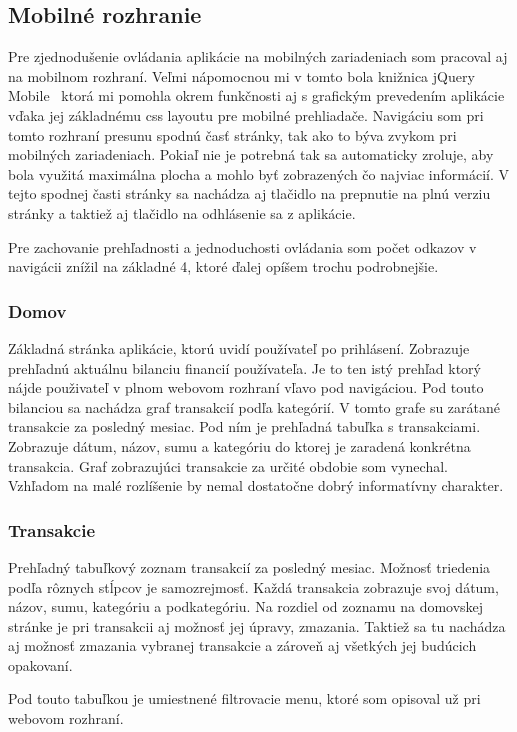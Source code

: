\documentclass[12pt,oneside]{book}
\begin{document}
\subsection{Mobilné rozhranie}
Pre zjednodušenie ovládania aplikácie na mobilných zariadeniach som pracoval aj na mobilnom rozhraní. Veľmi nápomocnou mi v tomto bola knižnica jQuery Mobile \cite{jQueryMobile}\, ktorá mi pomohla okrem funkčnosti aj s grafickým prevedením aplikácie vďaka jej základnému css layoutu pre mobilné prehliadače. Navigáciu som pri tomto rozhraní presunu spodnú časť stránky, tak ako to býva zvykom pri mobilných zariadeniach. Pokiaľ nie je potrebná tak sa automaticky zroluje, aby bola využitá maximálna plocha a mohlo byť zobrazených čo najviac informácií. V tejto spodnej časti stránky sa nachádza aj tlačidlo na prepnutie na plnú verziu stránky a taktiež aj tlačidlo na odhlásenie sa z aplikácie. 

Pre zachovanie prehľadnosti a jednoduchosti ovládania som počet odkazov v navigácii znížil na základné 4, ktoré ďalej opíšem trochu podrobnejšie. 

\subsubsection{Domov}
Základná stránka aplikácie, ktorú uvidí používateľ po prihlásení. Zobrazuje prehľadnú aktuálnu bilanciu financií používateľa. Je to ten istý prehľad ktorý nájde použivateľ v plnom webovom rozhraní  vľavo pod navigáciou. Pod touto bilanciou sa nachádza graf transakcií podľa kategórií. V tomto grafe su zarátané transakcie za posledný mesiac. Pod ním je prehľadná tabuľka s transakciami. Zobrazuje dátum, názov, sumu a kategóriu do ktorej je zaradená konkrétna transakcia. Graf zobrazujúci transakcie za určité obdobie som vynechal. Vzhľadom na malé rozlíšenie by nemal dostatočne dobrý informatívny charakter.
\subsubsection{Transakcie}
Prehľadný tabuľkový zoznam transakcií za posledný mesiac. Možnosť triedenia podľa rôznych stĺpcov je samozrejmosť. Každá transakcia zobrazuje svoj dátum, názov, sumu, kategóriu a podkategóriu. Na rozdiel od zoznamu na domovskej stránke je pri transakcii aj možnosť jej úpravy, zmazania. Taktiež sa tu nachádza aj možnosť zmazania vybranej transakcie a zároveň aj všetkých jej budúcich opakovaní.

Pod touto tabuľkou je umiestnené filtrovacie menu, ktoré som opisoval už pri webovom rozhraní.
\end{document}
